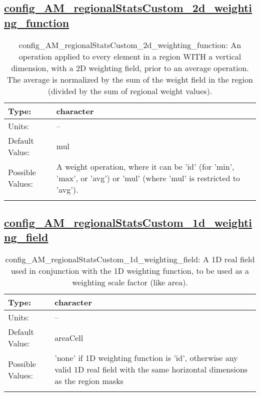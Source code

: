 \subsection[config\_AM\_regionalStatsCustom\_2d\_weighting\_function]{\hyperref[sec:nm_tab_AM_regionalStatsCustom]{config\_AM\_regionalStatsCustom\_2d\_weighting\_function}}
\label{subsec:nm_sec_config_AM_regionalStatsCustom_2d_weighting_function}
\begin{center}
\begin{longtable}{| p{2.0in} || p{4.0in} |}
    \hline
    Type: & character \\
    \hline
    Units: & -- \\
    \hline
    Default Value: & mul \\
    \hline
    Possible Values: & A weight operation, where it can be 'id' (for 'min', 'max', or 'avg') or 'mul' (where 'mul' is restricted to 'avg'). \\
    \hline
    \caption{config\_AM\_regionalStatsCustom\_2d\_weighting\_function: An operation applied to every element in a region WITH a vertical dimension, with a 2D weighting field, prior to an average operation. The average is normalized by the sum of the weight field in the region (divided by the sum of regional weight values).}
\end{longtable}
\end{center}
\subsection[config\_AM\_regionalStatsCustom\_1d\_weighting\_field]{\hyperref[sec:nm_tab_AM_regionalStatsCustom]{config\_AM\_regionalStatsCustom\_1d\_weighting\_field}}
\label{subsec:nm_sec_config_AM_regionalStatsCustom_1d_weighting_field}
\begin{center}
\begin{longtable}{| p{2.0in} || p{4.0in} |}
    \hline
    Type: & character \\
    \hline
    Units: & -- \\
    \hline
    Default Value: & areaCell \\
    \hline
    Possible Values: & 'none' if 1D weighting function is 'id', otherwise any valid 1D real field with the same horizontal dimensions as the region masks \\
    \hline
    \caption{config\_AM\_regionalStatsCustom\_1d\_weighting\_field: A 1D real field used in conjunction with the 1D weighting function, to be used as a weighting scale factor (like area).}
\end{longtable}
\end{center}
